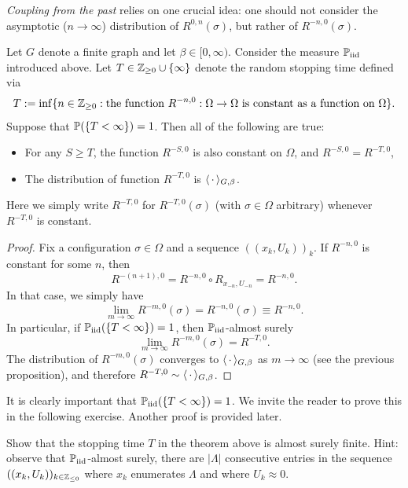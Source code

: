 \emph{Coupling from the past} relies on one crucial idea:
one should not consider the asymptotic ($n\to\infty$) distribution of $R^{0,n}(\sigma)$,
but rather of $R^{-n,0}(\sigma)$.

\begin{theorem}
    \label{thm:coupling_from_the_past}
    Let $G$ denote a finite graph and let $\beta\in[0,\infty)$.
    Consider the measure $\Piid$ introduced above.
    Let $T\in\Z_{\geq 0}\cup\{\infty\}$ denote the random stopping time
    defined via
    \[
        T:=\inf\{n\in\Z_{\geq 0}:\text{the function $R^{-n,0}:\Omega\to\Omega$ is
        constant as a function on $\Omega$}\}.
    \]
    Suppose that $\P(\{T<\infty\})=1$.
    Then all of the following are true:
    \begin{itemize}
        \item For any $S\geq T$, the function $R^{-S,0}$ is also constant on $\Omega$,
            and $R^{-S,0}=R^{-T,0}$,
        \item The distribution of function $R^{-T,0}$ is $\langle\blank\rangle_{G,\beta}$.
    \end{itemize}
    Here we simply write $R^{-T,0}$ for $R^{-T,0}(\sigma)$ (with $\sigma\in\Omega$ arbitrary)
    whenever $R^{-T,0}$ is constant.
\end{theorem}

\begin{proof}
    Fix a configuration $\sigma\in\Omega$
    and a sequence $((x_k,U_k))_k$.
    If $R^{-n,0}$ is constant for some $n$, then
    \[
        R^{-(n+1),0}=R^{-n,0}\circ R_{x_{-n},U_{-n}}=R^{-n,0}.
    \]
    In that case, we simply have
    \[
        \lim_{m\to\infty}R^{-m,0}(\sigma)=R^{-n,0}(\sigma)\equiv R^{-n,0}.
    \]
    In particular, if $\Piid(\{T<\infty\})=1$,
    then $\Piid$-almost surely
    \[
        \lim_{m\to\infty} R^{-m,0}(\sigma)=R^{-T,0}.
    \]
    The distribution of $R^{-m,0}(\sigma)$ converges to $\langle\blank\rangle_{G,\beta}$
    as $m\to\infty$ (see the previous proposition),
    and therefore $R^{-T,0}\sim\langle\blank\rangle_{G,\beta}$.
\end{proof}

It is clearly important that $\Piid(\{T<\infty\})=1$.
We invite the reader to prove this in the following exercise.
Another proof is provided later.

\begin{exercise}
    Show that the stopping time $T$ in the theorem above is almost surely finite.
    Hint: observe that $\Piid$-almost surely,
    there are $|\Lambda|$ consecutive entries in the sequence $((x_k,U_k))_{k\in\Z_{\leq 0}}$
    where $x_k$ enumerates $\Lambda$ and where $U_k\approx 0$.
\end{exercise}

